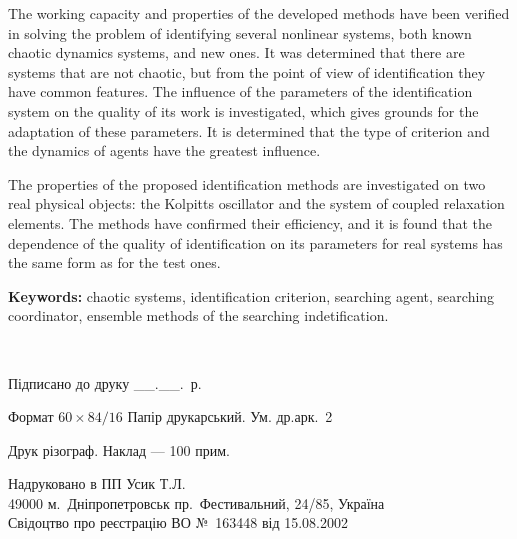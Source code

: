 \documentclass[a4paper,13pt]{atuaref}
\begin{document}
The working capacity and properties of the developed methods have been verified
in solving the problem of identifying several nonlinear systems, both known
chaotic dynamics systems, and new ones. It was determined that there are
systems that are not chaotic, but from the point of view of identification they
have common features. The influence of the parameters of the identification
system on the quality of its work is investigated, which gives grounds for the
adaptation of these parameters. It is determined that the type of criterion and
the dynamics of agents have the greatest influence.

The properties of the proposed identification methods are investigated on two
real physical objects: the Kolpitts oscillator and the system of coupled
relaxation elements. The methods have confirmed their efficiency, and it is
found that the dependence of the quality of identification on its parameters
for real systems has the same form as for the test ones.


\textbf{Keywords:}
chaotic systems,
identification criterion,
searching agent,
searching coordinator,
ensemble methods of the searching indetification.

\clearpage


{~}
\vfill
\thispagestyle{empty}


\begin{center}


Підписано до друку \_\_.\_\_.\bookyear~р.

Формат $60 \times 84/16$  Папір друкарський. Ум. др.арк.~2

Друк різограф. Наклад --- 100 прим.

Надруковано в ПП Усик Т.Л. \\
49000 м.~Дніпропетровськ пр.~Фестивальний, 24/85, Україна \\
Свідоцтво про реєстрацію ВО №~163448 від 15.08.2002
\end{center}


\vspace{4ex}

\clearpage
{~}
\thispagestyle{empty}
\end{document}
